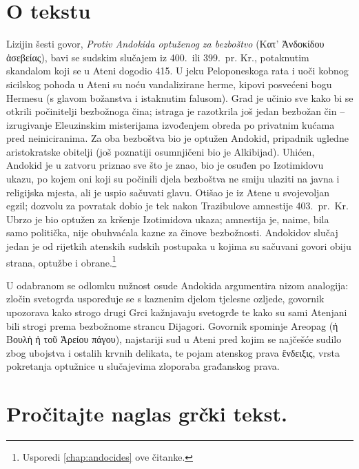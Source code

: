 
\section*{O tekstu}

Lizijin šesti govor, \textit{Protiv Andokida optuženog za bezboštvo} \textgreek{(Κατ' Ἀνδοκίδου ἀσεβείας),} bavi se sudskim slučajem iz 400.\ ili 399.\ pr. Kr., potaknutim skandalom koji se u Ateni dogodio 415. U jeku Peloponeskoga rata i uoči kobnog sicilskog pohoda u Ateni su noću vandalizirane herme, kipovi posvećeni bogu Hermesu (s glavom božanstva i istaknutim falusom). Grad je učinio sve kako bi se otkrili počinitelji bezbožnoga čina; istraga je razotkrila još jedan bezbožan čin – izrugivanje Eleuzinskim misterijama izvođenjem obreda po privatnim kućama pred neiniciranima. Za oba bezboštva bio je optužen Andokid, pripadnik ugledne aristokratske obitelji (još poznatiji osumnjičeni bio je Alkibijad). Uhićen, Andokid je u zatvoru priznao sve što je znao, bio je osuđen po Izotimidovu ukazu, po kojem oni koji su počinili djela bezboštva ne smiju ulaziti na javna i religijska mjesta, ali je uspio sačuvati glavu. Otišao je iz Atene u svojevoljan egzil; dozvolu za povratak dobio je tek nakon Trazibulove amnestije 403.\ pr.~Kr. Ubrzo je bio optužen za kršenje Izotimidova ukaza; amnestija je, naime, bila samo politička, nije obuhvaćala kazne za činove bezbožnosti. Andokidov slučaj jedan je od rijetkih atenskih sudskih postupaka u kojima su sačuvani govori obiju strana, optužbe i obrane.\footnote{Usporedi \autoref{chap:andocides} ove čitanke.}

U odabranom se odlomku nužnost osude Andokida argumentira nizom analogija: zločin svetogrđa uspoređuje se s kaznenim djelom tjelesne ozljede, govornik upozorava kako strogo drugi Grci kažnjavaju svetogrđe te kako su sami Atenjani bili strogi prema bezbožnome strancu Dijagori. Govornik spominje Areopag \textgreek{(ἡ Βουλὴ ἡ τοῦ Ἀρείου πάγου),} najstariji sud u Ateni pred kojim se najčešće sudilo zbog ubojstva i ostalih krvnih delikata, te pojam atenskog prava \textgreek{ἔνδειξις,} vrsta pokretanja optužnice u slučajevima zloporaba građanskog prava. 



\section*{Pročitajte naglas grčki tekst.}

